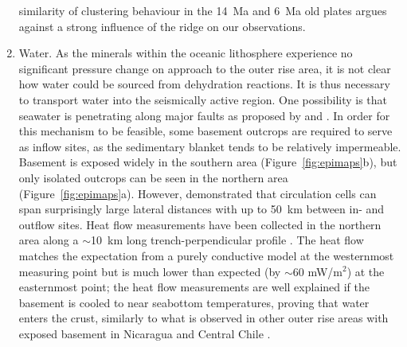 \documentclass[reviewcopy]{elsarticle}
\begin{document}
\begin{enumerate}
  similarity of clustering behaviour in the 14~Ma and 6~Ma old plates
  argues against a strong influence of the ridge on our observations.
\item Water. As the minerals within the oceanic lithosphere experience
  no significant pressure change on approach to the outer rise area,
  it is not clear how water could be sourced from dehydration
  reactions.  It is thus necessary to transport water into the
  seismically active region.   One possibility is that seawater is
  penetrating along major faults as proposed by \citet{peacock01} and
  \citet{ranero03}.   In order for this mechanism to be feasible,
  some basement outcrops are required to serve as inflow sites,
 as the sedimentary blanket tends to be relatively
 impermeable.
Basement is exposed widely in the southern area
(Figure~\ref{fig:epimaps}b), but only isolated outcrops can be seen in
the northern area (Figure~\ref{fig:epimaps}a).  However,
\citet{fisher03_juandefuca} demonstrated that circulation cells can span
surprisingly large lateral distances with up to 50~km between in- and
outflow sites.  Heat flow measurements have been collected in the
northern area along a $\sim$10~km long trench-perpendicular profile \citep[see
Figure~\protect\ref{fig:epimaps}a for approximate location]{contreras-reyes07}. The
heat flow matches the expectation from a purely conductive model at
the westernmost measuring point but is much lower than expected (by
$\sim$60 mW/m$^2$) at the easternmost point; the heat flow
measurements are well explained if the basement is cooled to near
seabottom temperatures, proving that water enters the crust, similarly
to what is observed in other outer rise areas with exposed
basement in Nicaragua and Central Chile \citep{grevemeyer05}.


\end{enumerate}
\end{document}
